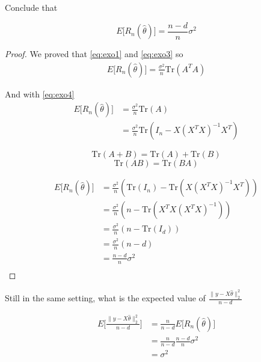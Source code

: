 
Conclude that

\begin{equation}
     E \Big[ R_n (\hat{\theta}) \Big] = \frac{n - d}{n} \sigma^2 
\end{equation}

\begin{proof}
    We proved that \eqref{eq:exo1} and \eqref{eq:exo3} so
    \begin{align*}
        E \Big[ R_n (\hat{\theta}) \Big] = \frac{\sigma^2}{n} \mathrm {Tr} (A^T A)
    \end{align*}

    And with \eqref{eq:exo4}
    \begin{align*}
        E \Big[ R_n (\hat{\theta}) \Big] &=\frac{\sigma^2}{n}  \mathrm {Tr} (A)\\
            &= \frac{\sigma^2}{n} \mathrm {Tr} (I_n - X (X^T X)^{-1} X^T)
    \end{align*}

    \begin{equation}
        \mathrm {Tr} (A + B) =\mathrm {Tr} (A) + \mathrm {Tr} (B)
    \end{equation}
    \begin{equation}
        \mathrm {Tr} (AB) = \mathrm {Tr} (BA)
    \end{equation}

    \begin{align*}
        E \Big[ R_n (\hat{\theta}) \Big]
            &= \frac{\sigma^2}{n} (\mathrm {Tr} (I_n) - \mathrm {Tr} (X (X^T X)^{-1} X^T))\\
            &= \frac{\sigma^2}{n} (n - \mathrm {Tr} (X^TX (X^T X)^{-1}))\\
            &= \frac{\sigma^2}{n} (n - \mathrm {Tr} (I_d))\\
            &= \frac{\sigma^2}{n} (n - d)\\
            &= \frac{n - d}{n} \sigma^2\\
    \end{align*}
\end{proof}


Still in the same setting, what is the expected value of $\frac{\| y - X \hat{\theta} \|_2^2}{n - d}$

\begin{align*}
    E \Big [ \frac{\| y - X \hat{\theta} \|_2^2}{n - d} \Big ] &= \frac{n}{n - d} E \Big [ R_n(\hat{\theta}) \Big ]\\
        &= \frac{n}{n-d} \frac{n - d}{n} \sigma^2\\
        &= \sigma^2
\end{align*}
